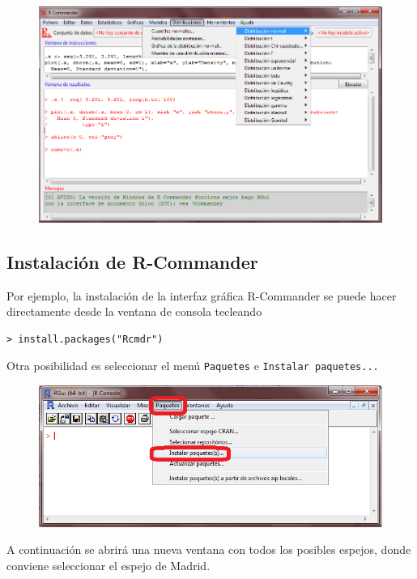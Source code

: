 \documentclass[]{book}
\begin{document}
\begin{figure}
\centering
\includegraphics{figuras/Rcommander.png}
\caption{}
\end{figure}

\subsection{Instalación de
R-Commander}\label{instalacion-de-r-commander}

Por ejemplo, la instalación de la interfaz gráfica R-Commander se puede
hacer directamente desde la ventana de consola tecleando

\begin{verbatim}
> install.packages("Rcmdr")
\end{verbatim}

Otra posibilidad es seleccionar el menú \texttt{Paquetes} e
\texttt{Instalar\ paquetes...}

\begin{figure}
\centering
\includegraphics{figuras/Rcommander1.png}
\caption{}
\end{figure}

A continuación se abrirá una nueva ventana con todos los posibles
espejos, donde conviene seleccionar el espejo de Madrid.
\end{document}
